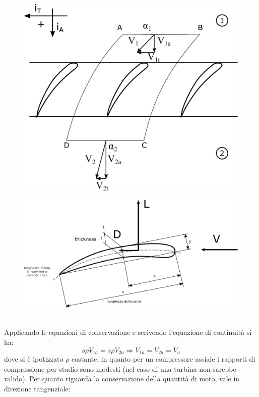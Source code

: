 \begin{figure}
\centering
\begin{minipage}{.4\textwidth}
  \centering
  \includegraphics[width=.95\linewidth]{fig/schiera1.pdf}
  \label{fig:schiera1}
\end{minipage}%
\begin{minipage}{.6\textwidth}
  \centering
  \includegraphics[width=.85\linewidth]{fig/LDref.pdf}
  \label{fig:LDref}
\end{minipage}
\end{figure}
\\Applicando le equazioni di conservazione e scrivendo l'equazione di continuità si ha:
\begin{equation}
s \rho V_{1a} = s \rho V_{2a} \Rightarrow V_{1a} = V_{2a} = V_a
\end{equation}
dove si è ipotizzato $\rho$ costante, in quanto per un compressore assiale i rapporti di compressione per stadio sono modesti (nel caso di una turbina non sarebbe valido). Per quanto riguarda la conservazione della quantità di moto, vale in direzione tangenziale:
